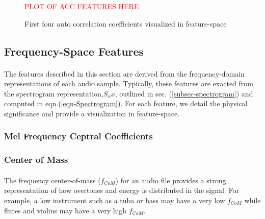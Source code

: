\documentclass[12pt,letterpaper]{article}
\begin{document}
\begin{figure}[H]
\label{fig-FeatureACC}
\begin{center}
\textcolor{red}{PLOT OF ACC FEATURES HERE}
\end{center}
\caption{First four auto correlation coefficients visualized in feature-space}
\end{figure}




\newpage

\subsection{Frequency-Space Features}
\label{subsec-frequency}

\paragraph*{}The features described in this section are derived from the frequency-domain representations of each audio sample. Typically, these features are exacted from the spectrogram representation,$S_xx$, outlined in sec. (\ref{subsec-spectrogram}) and computed in eqn.(\ref{eqn-Spectrogram}). For each feature, we detail the physical significance and provide a visualization in feature-space.

\subsubsection{Mel Frequency Ceptral Coefficients}

\subsubsection{Center of Mass}

\paragraph*{}The frequency center-of-mass ($f_{CoM}$) for an audio file provides a strong representation of how overtones and energy is distributed in the signal. For example, a low instrument such as a tuba or bass may have a very low $f_{CoM}$ while flutes and violins may have a very high $f_{CoM}$.


\newpage
\end{document}
